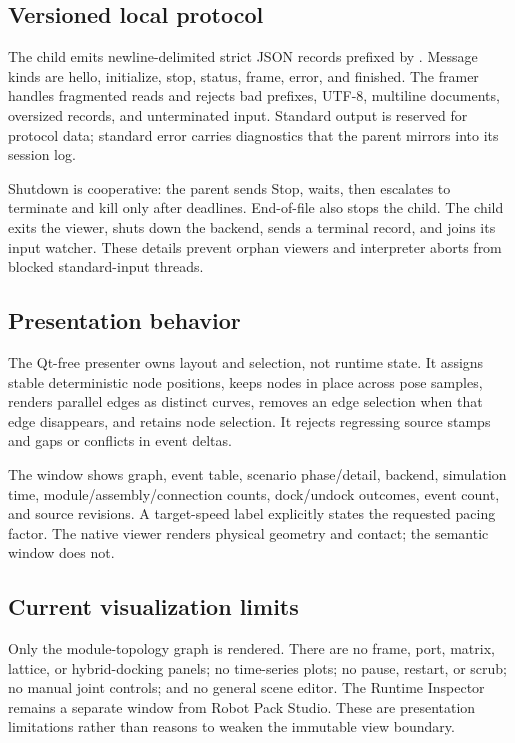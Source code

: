 \subsection{Versioned local protocol}

The child emits newline-delimited strict JSON records prefixed by
. Message kinds are hello, initialize, stop, status, frame,
error, and finished. The framer handles fragmented reads and rejects bad prefixes,
UTF-8, multiline documents, oversized records, and unterminated input. Standard output
is reserved for protocol data; standard error carries diagnostics that the parent
mirrors into its session log.

Shutdown is cooperative: the parent sends Stop, waits, then escalates to terminate and
kill only after deadlines. End-of-file also stops the child. The child exits the viewer,
shuts down the backend, sends a terminal record, and joins its input watcher. These
details prevent orphan viewers and interpreter aborts from blocked standard-input
threads.

\subsection{Presentation behavior}

The Qt-free presenter owns layout and selection, not runtime state. It assigns stable
deterministic node positions, keeps nodes in place across pose samples, renders parallel
edges as distinct curves, removes an edge selection when that edge disappears, and
retains node selection. It rejects regressing source stamps and gaps or conflicts in
event deltas.

The window shows graph, event table, scenario phase/detail, backend, simulation time,
module/assembly/connection counts, dock/undock outcomes, event count, and source
revisions. A target-speed label explicitly states the requested pacing factor. The
native viewer renders physical geometry and contact; the semantic window does not.

\subsection{Current visualization limits}

Only the module-topology graph is rendered. There are no frame, port, matrix, lattice,
or hybrid-docking panels; no time-series plots; no pause, restart, or scrub; no manual
joint controls; and no general scene editor. The Runtime Inspector remains a separate
window from Robot Pack Studio. These are presentation limitations rather than reasons
to weaken the immutable view boundary.


